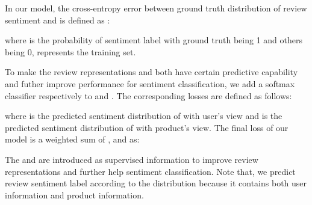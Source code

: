 \documentclass[letterpaper]{article} \usepackage{aaai18}  \usepackage{times}  \usepackage{helvet}  \usepackage{courier}  \usepackage{url}  \usepackage{graphicx}  \frenchspacing  \usepackage{amsmath}
\begin{document}
In our model, the cross-entropy error between ground truth distribution of review sentiment and  is defined as :

where  is the probability of sentiment label  with ground truth being 1 and others being 0,  represents the training set.

To make the review representations  and  both have certain predictive capability and futher improve performance for sentiment classification, we add a softmax classifier respectively to  and . The corresponding losses are defined as follows:

where  is the predicted sentiment distribution of with user's view and  is the predicted sentiment distribution of with product's view. The final loss of our model is a weighted sum of ,  and  as:

The  and  are introduced as supervised information to improve review representations and further help sentiment classification. Note that, we predict review sentiment label according to the distribution  because it contains both user information and product information.
\end{document}

